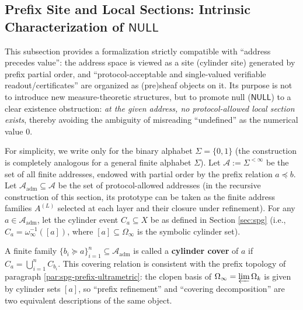 \subsection{Prefix Site and Local Sections: Intrinsic Characterization of \texorpdfstring{$\mathsf{NULL}$}{NULL}}\label{subsec:prefix-site-null}
This subsection provides a formalization strictly compatible with ``address precedes value'': the address space is viewed as a site (cylinder site) generated by prefix partial order, and ``protocol-acceptable and single-valued verifiable readout/certificates'' are organized as (pre)sheaf objects on it. Its purpose is not to introduce new measure-theoretic structures, but to promote null (\(\mathsf{NULL}\)) to a clear existence obstruction: \emph{at the given address, no protocol-allowed local section exists}, thereby avoiding the ambiguity of misreading ``undefined'' as the numerical value \(0\).

\begin{definition}\label{def:prefix-site}
For simplicity, we write only for the binary alphabet \(\Sigma=\{0,1\}\) (the construction is completely analogous for a general finite alphabet \(\Sigma\)). Let \(\mathcal{A}:=\Sigma^{<\infty}\) be the set of all finite addresses, endowed with partial order by the prefix relation \(a\preceq b\).
Let \(\mathcal{A}_{\mathrm{adm}}\subseteq\mathcal{A}\) be the set of protocol-allowed addresses (in the recursive construction of this section, its prototype can be taken as the finite address families \(A^{(L)}\) selected at each layer and their closure under refinement).
For any \(a\in\mathcal{A}_{\mathrm{adm}}\), let the cylinder event \(C_a\subseteq X\) be as defined in Section \ref{sec:spg} (i.e., \(C_a=\omega_\infty^{-1}([a])\), where \([a]\subseteq\Omega_\infty\) is the symbolic cylinder set).
\par
A finite family \(\{b_i\succeq a\}_{i=1}^n\subseteq\mathcal{A}_{\mathrm{adm}}\) is called a \textbf{cylinder cover} of \(a\) if \(C_a=\bigcup_{i=1}^{n} C_{b_i}\).
This covering relation is consistent with the prefix topology of paragraph \ref{par:spg-prefix-ultrametric}: the clopen basis of \(\Omega_\infty=\varprojlim \Omega_k\) is given by cylinder sets \([a]\), so ``prefix refinement'' and ``covering decomposition'' are two equivalent descriptions of the same object.
\end{definition}

